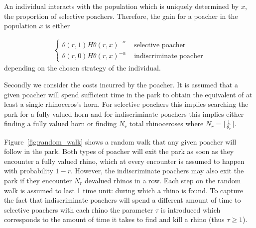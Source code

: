 \documentclass[10pt]{article}
\begin{document}
An individual interacts with the population which is uniquely determined by
\(x\), the proportion of selective poachers.
Therefore, the gain for a poacher in the population \(x\) is either

\begin{eqnarray}
    \label{eqn:gain}
    \left\{
    \begin{array}{cl}
    \theta(r, 1) H \theta(r, x)^{-\alpha} & \mbox{ selective poacher}
    \\
    \theta(r, 0) H \theta(r, x)^{-\alpha} & \mbox{ indiscriminate poacher}
    \end{array} \right.
\end{eqnarray}
depending on the chosen strategy of the individual.

Secondly we consider the costs incurred by the poacher. It is assumed that a given
poacher will spend sufficient time in the park to
obtain the equivalent of at least a single rhinoceros's horn. For selective poachers this
implies searching the park for a fully valued horn and for indiscriminate
poachers this implies either finding a fully valued horn or finding \(N_r\)
total rhinoceroses where \(N_r = \lceil \frac{1}{\theta_r} \rceil\).

Figure~\ref{fig:random_walk} shows a random walk that any given poacher will
follow in the park. Both types of poacher will exit the park as soon as they
encounter a fully valued rhino, which at every encounter is assumed to happen
with probability \(1 - r\). However, the indiscriminate poachers may also exit
the park if they encounter \(N_r\) devalued rhinos in a row.  Each step on the
random walk is assumed to last 1 time unit: during which a rhino is found.  To
capture the fact that indiscriminate poachers will spend a different amount of
time to selective poachers with each rhino the parameter \(\tau\) is introduced
which corresponds to the amount of time it takes to find and kill a rhino (thus
\(\tau\geq 1\)).
\end{document}
